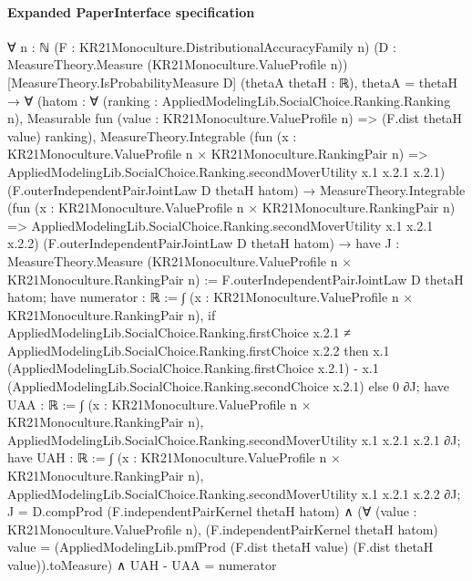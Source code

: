\documentclass[10pt]{article}
\begin{document}
\paragraph{Expanded PaperInterface specification}
\begin{ReviewVerbatim}
∀ {n : ℕ} (F : KR21Monoculture.DistributionalAccuracyFamily n)
  (D : MeasureTheory.Measure (KR21Monoculture.ValueProfile n)) [MeasureTheory.IsProbabilityMeasure D]
  (thetaA thetaH : ℝ),
  thetaA = thetaH →
    ∀
      (hatom :
        ∀ (ranking : AppliedModelingLib.SocialChoice.Ranking.Ranking n),
          Measurable fun (value : KR21Monoculture.ValueProfile n) => (F.dist thetaH value) ranking),
      MeasureTheory.Integrable
          (fun (x : KR21Monoculture.ValueProfile n × KR21Monoculture.RankingPair n) =>
            AppliedModelingLib.SocialChoice.Ranking.secondMoverUtility x.1 x.2.1 x.2.1)
          (F.outerIndependentPairJointLaw D thetaH hatom) →
        MeasureTheory.Integrable
            (fun (x : KR21Monoculture.ValueProfile n × KR21Monoculture.RankingPair n) =>
              AppliedModelingLib.SocialChoice.Ranking.secondMoverUtility x.1 x.2.1 x.2.2)
            (F.outerIndependentPairJointLaw D thetaH hatom) →
          have J : MeasureTheory.Measure (KR21Monoculture.ValueProfile n × KR21Monoculture.RankingPair n) :=
            F.outerIndependentPairJointLaw D thetaH hatom;
          have numerator : ℝ :=
            ∫ (x : KR21Monoculture.ValueProfile n × KR21Monoculture.RankingPair n),
              if
                  AppliedModelingLib.SocialChoice.Ranking.firstChoice x.2.1 ≠
                    AppliedModelingLib.SocialChoice.Ranking.firstChoice x.2.2 then
                x.1 (AppliedModelingLib.SocialChoice.Ranking.firstChoice x.2.1) -
                  x.1 (AppliedModelingLib.SocialChoice.Ranking.secondChoice x.2.1)
              else 0 ∂J;
          have UAA : ℝ :=
            ∫ (x : KR21Monoculture.ValueProfile n × KR21Monoculture.RankingPair n),
              AppliedModelingLib.SocialChoice.Ranking.secondMoverUtility x.1 x.2.1 x.2.1 ∂J;
          have UAH : ℝ :=
            ∫ (x : KR21Monoculture.ValueProfile n × KR21Monoculture.RankingPair n),
              AppliedModelingLib.SocialChoice.Ranking.secondMoverUtility x.1 x.2.1 x.2.2 ∂J;
          J = D.compProd (F.independentPairKernel thetaH hatom) ∧
            (∀ (value : KR21Monoculture.ValueProfile n),
                (F.independentPairKernel thetaH hatom) value =
                  (AppliedModelingLib.pmfProd (F.dist thetaH value) (F.dist thetaH value)).toMeasure) ∧
              UAH - UAA = numerator
\end{ReviewVerbatim}
\end{document}
